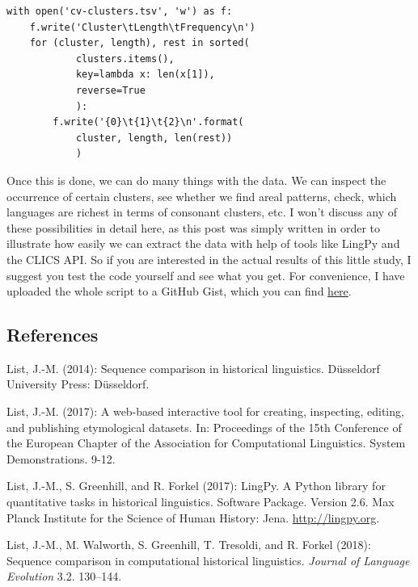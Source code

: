 \documentclass[
  a4paper,
  14pt,
  oneside,
  tablecaptionabove
]{scrbook}
\begin{document}
\begin{lstlisting}[basicstyle=\small]
with open('cv-clusters.tsv', 'w') as f:
    f.write('Cluster\tLength\tFrequency\n')
    for (cluster, length), rest in sorted(
            clusters.items(), 
            key=lambda x: len(x[1]),
            reverse=True
            ):
        f.write('{0}\t{1}\t{2}\n'.format(
            cluster, length, len(rest))
            )
\end{lstlisting}

Once this is done, we can do many things with the data. We can inspect
the occurrence of certain clusters, see whether we find areal patterns,
check, which languages are richest in terms of consonant clusters, etc.
I won't discuss any of these possibilities in detail here, as this post
was simply written in order to illustrate how easily we can extract the
data with help of tools like LingPy and the CLICS API. So if you are
interested in the actual results of this little study, I suggest you
test the code yourself and see what you get. For convenience, I have
uploaded the whole script to a GitHub Gist, which you can find
\href{https://gist.github.com/LinguList/1056960125ca79428b420257fa4b02eb}{here}.

\subsection*{References}

\nopagebreak\hangindent=0.7cm {\small List, J.-M. (2014): {Sequence comparison in historical
linguistics}.  Düsseldorf University Press: Düsseldorf. }

\nopagebreak\hangindent=0.7cm {\small List, J.-M. (2017): {A web-based interactive tool for creating,
inspecting, editing, and publishing etymological datasets}.  In:
{Proceedings of the 15th Conference of the European Chapter of
the Association for Computational Linguistics. System Demonstrations}. 
9-12. }

\nopagebreak\hangindent=0.7cm {\small List, J.-M., S. Greenhill, and R. Forkel (2017): {LingPy. A
Python library for quantitative tasks in historical linguistics}. 
Software Package. Version 2.6. Max Planck Institute for the Science of
Human History: Jena. \href{//lingpy.org”}{http://lingpy.org}.  }

\nopagebreak\hangindent=0.7cm {\small List, J.-M., M. Walworth, S. Greenhill, T. Tresoldi, and R. Forkel
(2018): {Sequence comparison in computational historical
linguistics}.  \emph{Journal of Language Evolution} 3.2. 130--144. }
\end{document}
